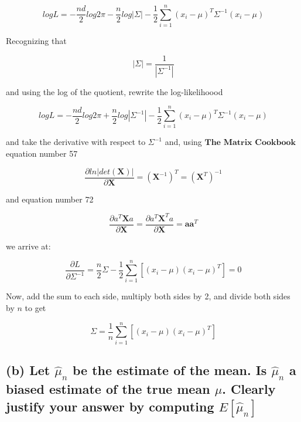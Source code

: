 \documentclass{article}
\begin{document}
\begin{equation}
log L = - \frac{nd}{2} log 2\pi - \frac{n}{2} log | \Sigma| - \frac{1}{2} \sum\limits_{i = 1}^n (x_i - \mu)^T \Sigma^{-1} (x_i - \mu)
\end{equation}

\noindent Recognizing that

\begin{equation}
|\Sigma| = \frac{1}{|\Sigma^{-1}|}
\end{equation}

\noindent and using the log of the quotient, rewrite the log-likelihoood

\begin{equation}
log L = - \frac{nd}{2} log 2\pi + \frac{n}{2} log |\Sigma^{-1} | - \frac{1}{2} \sum\limits_{i = 1}^n (x_i - \mu)^T \Sigma^{-1} (x_i - \mu)
\end{equation}

\noindent and take the derivative with respect to $\Sigma^{-1}$ and, using $\textbf{The Matrix Cookbook}$ equation number 57

\begin{equation}
\frac{\partial ln | det(\textbf{X}) |}{\partial \textbf{X}} = (\textbf{X}^{-1})^T = (\textbf{X}^T)^{-1}
\end{equation}

\noindent  and equation number 72

\begin{equation}
\frac{\partial a^T\textbf{X}a}{\partial \textbf{X}} = \frac{\partial a^T \textbf{X}^T a}{\partial \textbf{X}} = \textbf{aa}^T
\end{equation}

\noindent we arrive at:

\begin{equation}
\frac{\partial L}{\partial \Sigma^{-1}} = \frac{n}{2} \Sigma - \frac{1}{2} \sum\limits_{i = 1}^n [(x_i - \mu) (x_i - \mu)^T] = 0
\end{equation}

Now, add the sum to each side, multiply both sides by 2, and divide both sides by $n$ to get

\begin{equation}
\Sigma = \frac{1}{n} \sum\limits_{i = 1}^n [ (x_i - \mu)(x_i - \mu)^T]
\end{equation}


\subsection{(b) Let $\hat\mu_n$ be the estimate of the mean. Is $\hat\mu_n$ a biased estimate of the true mean $\mu$.  Clearly justify your answer by computing $E[\hat\mu_n]$}
\end{document}
